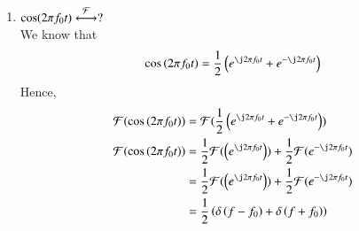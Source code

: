 \documentclass[journal,12pt,twocolumn]{IEEEtran}
\renewcommand\thesection{\arabic{section}}
\begin{document}
\begin{enumerate}[label=\thesection.\arabic*
	,ref=\thesection.\theenumi]
\begin{align}
	g(t)e^{-j2\pi f_0t}&\system{F} \int_{-\infty}^{\infty}g(t)e^{-\j2\pi ft}e^{-j2\pi f_0t}\\
	g(t)e^{-j2\pi f_0t}&\system{F} G(f)e^{-j2\pi f_0 f}\\
\end{align}
From \eqref{eq:3.4.1},
\begin{align}
	g(t-f_0)&\system{F}G(f)e^{-\j2\pi ft f_0}\\
	g(t)e^{-j2\pi f_0t}&\system{F} G(f)e^{-j2\pi f_0 f}\\
\end{align}
From \eqref{eq:inverseFourier},
\begin{align}
	\delta(t)&\system{F}1\\
	1&\system{F}\delta(-f)=\delta(f)
\end{align}
Hence, 
\begin{align}
	g(t-f_0)&\system{F} \delta((f+f_0))
\end{align}
	\begin{align}
		g(t)e^{\j2\pi f_0t}&\system{F}\int_{-\infty}^{\infty}
		g(t)e^{-\j2\pi\brak{f-f_0}t}\, dt \\
		&=G(f-f_0)
		\label{eq:f-shift}
	\end{align}
	Hence,
	\begin{align}
		e^{-\j2\pi f_0t}\system{F}\delta(-(f+f_0)) = \delta(f+f_0)
		\label{eq:fourier-exp}
	\end{align}
	\item $\cos(2\pi f_0t)\overset{\mathcal{F}}{ \longleftrightarrow}?$\\
	\solution We know that 
	\begin{align}
			\cos\brak{2\pi f_0t} = \frac{1}{2}
			\brak{e^{\j2\pi f_0t} + e^{-\j2\pi f_0t}} \\
	\end{align}
Hence,
\begin{align}
\mathcal{F}(\cos\brak{2\pi f_0t})&=\mathcal{F}(\frac{1}{2}
\brak{e^{\j2\pi f_0t} + e^{-\j2\pi f_0t}})\\
\mathcal{F}(\cos\brak{2\pi f_0t})&=\frac{1}{2} \mathcal{F}(
\brak{e^{\j2\pi f_0t}})+ \frac{1}{2} \mathcal{F}(e^{-\j2\pi f_0t})\\
&=\frac{1}{2} \mathcal{F}(
\brak{e^{\j2\pi f_0t}})+ \frac{1}{2} \mathcal{F}(e^{-\j2\pi f_0t})\\
&=\frac{1}{2}\brak{\delta\brak{f-f_0} + \delta\brak{f+f_0}}
\end{align}
%

\end{enumerate}
\end{document}
